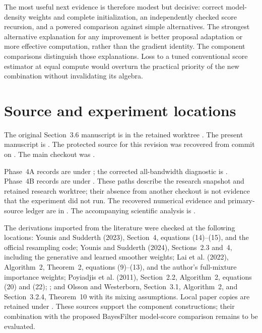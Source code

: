 \documentclass[11pt]{article}
\begin{document}
The most useful next evidence is therefore modest but decisive: correct
model-density weights and complete initialization, an independently checked
score recursion, and a powered comparison against simple alternatives. The
strongest alternative explanation for any improvement is better proposal
adaptation or more effective computation, rather than the gradient identity.
The component comparisons distinguish those explanations. Loss to a tuned
conventional score estimator at equal compute would overturn the practical
priority of the new combination without invalidating its algebra.


\appendix
\section{Source and experiment locations}

The original Section~3.6 manuscript is
in the retained worktree
.
The present manuscript is
.
The protected source for this revision was recovered from commit
 on
. The main checkout was
.

Phase~4A records are under
; the
corrected all-bandwidth diagnostic is
.
Phase~4B records are under
.
These paths describe the research snapshot and retained research worktree;
their absence from another checkout is not evidence that the experiment did
not run. The recovered numerical evidence and primary-source ledger are in
.
The accompanying scientific analysis is
.

The derivations imported from the literature were checked at the following
locations: Younis and Sudderth (2023), Section~4, equations (14)--(15), and
the official resampling code; Younis and Sudderth (2024), Sections~2.3 and~4,
including the generative and learned smoother weights; Lai et al. (2022),
Algorithm~2, Theorem~2, equations (9)--(13), and the author's full-mixture
importance weights; Poyiadjis et al. (2011), Section~2.2, Algorithm~2,
equations (20) and (22); \citet[Section~4.2, equations (24)--(25)]{scibior2021dpf};
and Olsson and Westerborn, Section~3.1, Algorithm~2, and Section~3.2.4,
Theorem~10 with its mixing assumptions. Local paper copies are retained under
. These sources support the component
constructions; their combination with the proposed BayesFilter model-score
comparison remains to be evaluated.
\end{document}
